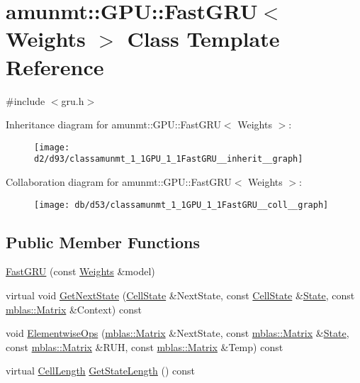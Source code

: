 \hypertarget{classamunmt_1_1GPU_1_1FastGRU}{}\section{amunmt\+:\+:G\+PU\+:\+:Fast\+G\+RU$<$ Weights $>$ Class Template Reference}
\label{classamunmt_1_1GPU_1_1FastGRU}


{\ttfamily \#include $<$gru.\+h$>$}



Inheritance diagram for amunmt\+:\+:G\+PU\+:\+:Fast\+G\+RU$<$ Weights $>$\+:
\nopagebreak
\begin{figure}[H]
\begin{center}
\leavevmode
\texttt{[image: d2/d93/classamunmt\_1\_1GPU\_1\_1FastGRU\_\_inherit\_\_graph]}
\end{center}
\end{figure}


Collaboration diagram for amunmt\+:\+:G\+PU\+:\+:Fast\+G\+RU$<$ Weights $>$\+:
\nopagebreak
\begin{figure}[H]
\begin{center}
\leavevmode
\texttt{[image: db/d53/classamunmt\_1\_1GPU\_1\_1FastGRU\_\_coll\_\_graph]}
\end{center}
\end{figure}
\subsection*{Public Member Functions}
\begin{DoxyCompactItemize}
\item 
\hyperlink{classamunmt_1_1GPU_1_1FastGRU_ad194ae3cba0565a97dbf16b74308d49a}{Fast\+G\+RU} (const \hyperlink{structamunmt_1_1GPU_1_1Weights}{Weights} \&model)
\item 
virtual void \hyperlink{classamunmt_1_1GPU_1_1FastGRU_a80dfed3a6e61b1ee726085adb714deb0}{Get\+Next\+State} (\hyperlink{structamunmt_1_1GPU_1_1CellState}{Cell\+State} \&Next\+State, const \hyperlink{structamunmt_1_1GPU_1_1CellState}{Cell\+State} \&\hyperlink{classamunmt_1_1State}{State}, const \hyperlink{namespaceamunmt_1_1GPU_1_1mblas_ab67821a8254de53e45a623cf73c0aef6}{mblas\+::\+Matrix} \&Context) const 
\item 
void \hyperlink{classamunmt_1_1GPU_1_1FastGRU_add49af38ef2aa9a37b3b4da08bb03eae}{Elementwise\+Ops} (\hyperlink{namespaceamunmt_1_1GPU_1_1mblas_ab67821a8254de53e45a623cf73c0aef6}{mblas\+::\+Matrix} \&Next\+State, const \hyperlink{namespaceamunmt_1_1GPU_1_1mblas_ab67821a8254de53e45a623cf73c0aef6}{mblas\+::\+Matrix} \&\hyperlink{classamunmt_1_1State}{State}, const \hyperlink{namespaceamunmt_1_1GPU_1_1mblas_ab67821a8254de53e45a623cf73c0aef6}{mblas\+::\+Matrix} \&R\+UH, const \hyperlink{namespaceamunmt_1_1GPU_1_1mblas_ab67821a8254de53e45a623cf73c0aef6}{mblas\+::\+Matrix} \&Temp) const 
\item 
virtual \hyperlink{structamunmt_1_1GPU_1_1CellLength}{Cell\+Length} \hyperlink{classamunmt_1_1GPU_1_1FastGRU_ae99ea776f3f65eb593621f733feffeb0}{Get\+State\+Length} () const 
\end{DoxyCompactItemize}
